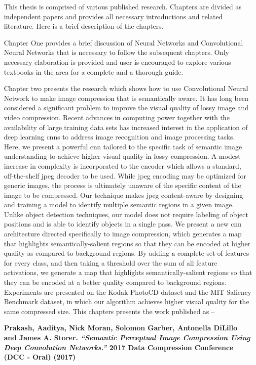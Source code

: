 This thesis is comprised of various published research. Chapters are divided as independent papers and provides all necessary introductions and related literature. Here is a brief description of the chapters.

Chapter One provides a brief discussion of Neural Networks and Convolutional Neural Networks that is necessary to follow the subsequent chapters. Only necessary elaboration is provided and user is encouraged to explore various textbooks in the area for a complete and a thorough guide.

Chapter two presents the research which shows how to use Convolutional Neural Network to make image compression that is semantically aware.
It has long been considered a significant problem to improve the visual quality of lossy image and video compression. Recent advances in computing power together with the availability of large training data sets has increased interest in the application of deep learning cnns to address image recognition and image processing tasks. Here, we present a powerful cnn tailored to the specific task of semantic image understanding to achieve higher visual quality in lossy compression. A modest increase in complexity is incorporated to the encoder which allows a standard, off-the-shelf jpeg decoder to be used. While jpeg encoding may be optimized for generic images, the process is ultimately unaware of the specific content of the image to be compressed. Our technique makes jpeg content-aware by designing and training a model to identify multiple semantic regions in a given image. Unlike object detection techniques, our model does not require labeling of object positions and is able to identify objects in a single pass. We present a new cnn architecture directed specifically to image compression, which generates a map that highlights semantically-salient regions so that they can be encoded at higher quality as compared to background regions. By adding a complete set of features for every class, and then taking a threshold over the sum of all feature activations, we generate a map that highlights semantically-salient regions so that they can be encoded at a better quality compared to background regions. Experiments are presented on the Kodak PhotoCD dataset and the MIT Saliency Benchmark dataset, in which our algorithm achieves higher visual quality for the same compressed size.
This chapters presents the work published as --

\noindent\textbf{
Prakash, Aaditya, Nick Moran, Solomon Garber, Antonella DiLillo and James A. Storer. \textit{``Semantic Perceptual Image Compression Using Deep Convolution Networks.''} 2017 Data Compression Conference (DCC - Oral) (2017)
}
\vspace{2em}

